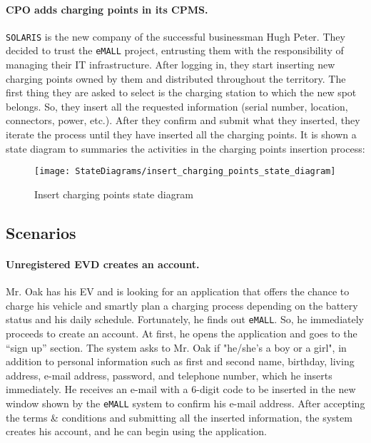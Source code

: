 \paragraph{CPO adds charging points in its CPMS.}
\verb|SOLARIS| is the new company of the successful businessman Hugh Peter.
They decided to trust the \verb|eMALL| project, entrusting them with the responsibility of managing their IT infrastructure.
After logging in, they start inserting new charging points owned by them and distributed throughout the territory.
The first thing they are asked to select is the charging station to which the new spot belongs.
So, they insert all the requested information (serial number, location, connectors, power, etc.).
After they confirm and submit what they inserted, they iterate the process until they have inserted all the charging points.
It is shown a state diagram to summaries the activities in the charging points insertion process:
\begin{figure}[H]
    \begin{center}
        \texttt{[image: StateDiagrams/insert\_charging\_points\_state\_diagram]}
        \caption{Insert charging points state diagram}
        \label{fig:insert_charging_points_sd}%
    \end{center}
\end{figure}

\subsection{Scenarios}
\label{subsec:scenarios}%

\paragraph{Unregistered EVD creates an account.}
Mr. Oak has his EV and is looking for an application that offers the chance to charge his vehicle and smartly plan a
charging process depending on the battery status and his daily schedule.
Fortunately, he finds out \verb|eMALL|\@.
So, he immediately proceeds to create an account.
At first, he opens the application and goes to the ``sign up'' section.
The system asks to Mr. Oak if "he/she's a boy or a girl", in addition to personal information such as first and second name, birthday, living address, e-mail address, password, and telephone number, which he inserts immediately.
He receives an e-mail with a 6-digit code to be inserted in the new window shown by the \verb|eMALL| system to confirm his e-mail address.
After accepting the terms \& conditions and submitting all the inserted information, the system creates his account,
and he can begin using the application.

